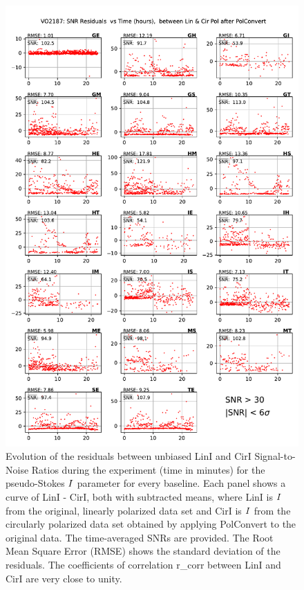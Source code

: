 \documentclass[letterpaper,twoside,12pt]{article}
\begin{document}
\begin{figure}[ht!]
  \begin{center}
  \includegraphics[width=33pc]{VO2187_SNR_Lin_I_minus_Cir_I_SNR_floor_30.pdf}
  \caption{\small  Evolution of the residuals between unbiased LinI and CirI Signal-to-Noise Ratios during the experiment (time in minutes) for the pseudo-Stokes $\protect I$ parameter for every baseline. Each panel shows a curve of LinI - CirI, both with subtracted means, where LinI is $\protect I$ from the original, linearly polarized data set and CirI is $\protect I$ from the circularly polarized data set obtained by applying PolConvert to the original data. The time-averaged SNRs are provided. The Root Mean Square Error (RMSE) shows the standard deviation of the residuals. The coefficients of correlation r\_corr between LinI and CirI are very close to unity.}
  \label{snr_lin_minus_cir}
  \end{center}
\end{figure}
\end{document}
